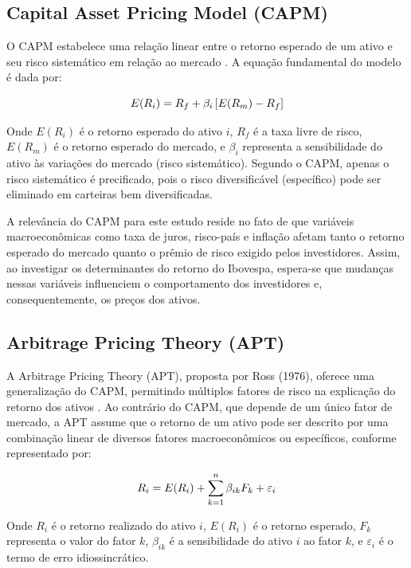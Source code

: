 \documentclass[	12pt, Times, openright, oneside, a4paper, english, brazil]{abntex2}
\begin{document}
\subsection{Capital Asset Pricing Model (CAPM)}
O CAPM estabelece uma relação linear entre o retorno esperado de um ativo e seu risco sistemático em relação ao mercado \cite{French2003}. A equação fundamental do modelo é dada por:

\begin{equation}\hfill
E(R_i) = R_f + \beta_i \left[ E(R_m) - R_f \right]
\label{eq:capm}
\end{equation}

Onde $E(R_i)$ é o retorno esperado do ativo $i$, $R_f$ é a taxa livre de risco, $E(R_m)$ é o retorno esperado do mercado, e $\beta_i$ representa a sensibilidade do ativo às variações do mercado (risco sistemático). Segundo o CAPM, apenas o risco sistemático é precificado, pois o risco diversificável (específico) pode ser eliminado em carteiras bem diversificadas.

A relevância do CAPM para este estudo reside no fato de que variáveis macroeconômicas como taxa de juros, risco-país e inflação afetam tanto o retorno esperado do mercado quanto o prêmio de risco exigido pelos investidores. Assim, ao investigar os determinantes do retorno do Ibovespa, espera-se que mudanças nessas variáveis influenciem o comportamento dos investidores e, consequentemente, os preços dos ativos.

\subsection{Arbitrage Pricing Theory (APT)}
A Arbitrage Pricing Theory (APT), proposta por Ross (1976), oferece uma generalização do CAPM, permitindo múltiplos fatores de risco na explicação do retorno dos ativos \cite{ross1976arbitrage}. Ao contrário do CAPM, que depende de um único fator de mercado, a APT assume que o retorno de um ativo pode ser descrito por uma combinação linear de diversos fatores macroeconômicos ou específicos, conforme representado por:

\begin{equation}\hfill
R_i = E(R_i) + \sum_{k=1}^{n} \beta_{ik} F_k + \varepsilon_i
\label{eq:apt}
\end{equation}

Onde $R_i$ é o retorno realizado do ativo $i$, $E(R_i)$ é o retorno esperado, $F_k$ representa o valor do fator $k$, $\beta_{ik}$ é a sensibilidade do ativo $i$ ao fator $k$, e $\varepsilon_i$ é o termo de erro idiossincrático.
\end{document}
